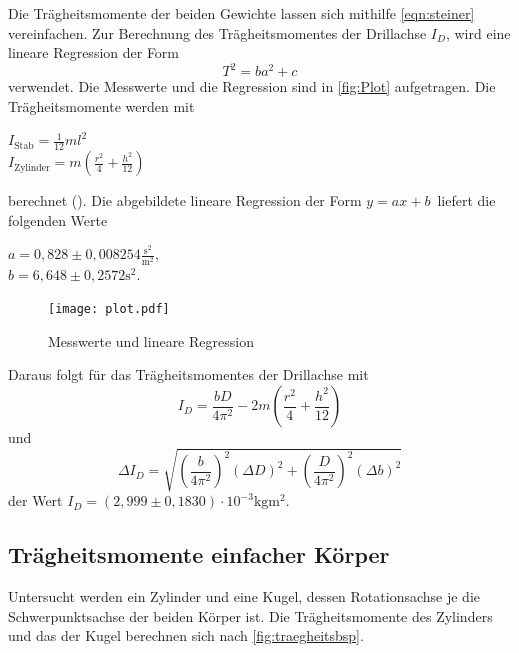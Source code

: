 \sloppy
Die Trägheitsmomente der beiden Gewichte lassen sich mithilfe \autoref{eqn:steiner} vereinfachen. Zur Berechnung
des Trägheitsmomentes der Drillachse $I_D$, wird eine lineare Regression der Form
\begin{equation}
  \label{eqn:linReg}
  T^2 = ba^2+c
\end{equation}
verwendet.
Die Messwerte und die Regression sind in \autoref{fig:Plot} aufgetragen. Die Trägheitsmomente werden mit
\begin{center}
  $I_{\text{Stab}} = \frac{1}{12} ml^2 $ \\
  $I_{\text{Zylinder}} = m (\frac{r^2}{4} +\frac{h^2}{12}) $ \\
\end{center}
berechnet (\cite{Anleitung}).
Die abgebildete lineare Regression der Form $ y = ax + b \,$ liefert die folgenden Werte
\begin{center}
  $ a = 0,828 \pm 0,008254 \frac{\si{\s^2}}{\si{\m^2}}$, \\
  $ b = 6,648 \pm 0,2572 \si{\s^2}$. \\
\end{center}

\begin{figure}[H]
  \centering
  \texttt{[image: plot.pdf]}
  \caption{Messwerte und lineare Regression}
  \label{fig:Plot}
\end{figure}
Daraus folgt für das Trägheitsmomentes der Drillachse mit
\begin{equation*}
  I_D = \frac{bD}{4 \pi ^2} - 2m (\frac{r^2}{4} + \frac{h^2}{12})
\end{equation*}
und
\begin{equation*}
  \Delta I_D = \sqrt{(\frac{b}{4 \pi ^2})^2  (\Delta D)^2 + (\frac{D}{4 \pi ^2})^2  (\Delta b)^2}
\end{equation*}
der Wert $I_D = (2,999 \pm 0,1830) \cdot 10^{-3} \si{\kilogram\meter^2}$.

\subsection{Trägheitsmomente einfacher Körper}
\label{sec:Trägheitsmomente einfacher Körper}

Untersucht werden ein Zylinder und eine Kugel, dessen Rotationsachse je die Schwerpunktsachse der beiden Körper ist.
Die Trägheitsmomente des Zylinders und das der Kugel berechnen sich nach \autoref{fig:traegheitsbsp}.




